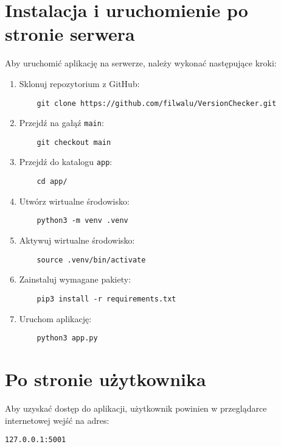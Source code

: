 \section{Instalacja i uruchomienie po stronie serwera}

Aby uruchomić aplikację na serwerze, należy wykonać następujące kroki:

\begin{enumerate}
    \item Sklonuj repozytorium z GitHub:
    \begin{verbatim}
    git clone https://github.com/filwalu/VersionChecker.git
    \end{verbatim}
    \item Przejdź na gałąź \texttt{main}:
    \begin{verbatim}
    git checkout main
    \end{verbatim}
    \item Przejdź do katalogu \texttt{app}:
    \begin{verbatim}
    cd app/
    \end{verbatim}
    \item Utwórz wirtualne środowisko:
    \begin{verbatim}
    python3 -m venv .venv
    \end{verbatim}
    \item Aktywuj wirtualne środowisko:
    \begin{verbatim}
    source .venv/bin/activate
    \end{verbatim}
    \item Zainstaluj wymagane pakiety:
    \begin{verbatim}
    pip3 install -r requirements.txt
    \end{verbatim}
    \item Uruchom aplikację:
    \begin{verbatim}
    python3 app.py
    \end{verbatim}
\end{enumerate}

\section{Po stronie użytkownika}

Aby uzyskać dostęp do aplikacji, użytkownik powinien w przeglądarce internetowej wejść na adres:

\begin{verbatim}
127.0.0.1:5001
\end{verbatim}

